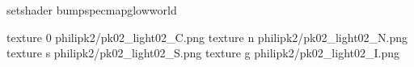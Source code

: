 setshader bumpspecmapglowworld


texture 0 philipk2/pk02_light02_C.png
texture n philipk2/pk02_light02_N.png
texture s philipk2/pk02_light02_S.png
texture g philipk2/pk02_light02_I.png

